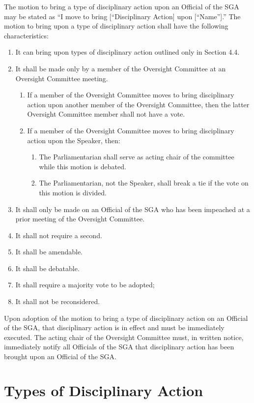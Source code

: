 \documentclass[12pt]{scrreprt}
\begin{document}
The motion to bring a type of disciplinary action upon an Official of the SGA may be stated as “I move to
bring [“Disciplinary Action] upon [“Name”].” The motion to bring upon a type of disciplinary action
shall have the following characteristics:
\begin{enumerate}
    \item It can bring upon types of disciplinary action outlined only in Section 4.4.
    \item It shall be made only by a member of the Oversight Committee at an Oversight Committee
meeting.
    \begin{enumerate}
        \item If a member of the Oversight Committee moves to bring disciplinary action upon another
member of the Oversight Committee, then the latter Oversight Committee member shall
not have a vote.
        \item  If a member of the Oversight Committee moves to bring disciplinary action upon the
Speaker, then:
    \begin{enumerate}
        \item The Parliamentarian shall serve as acting chair of the committee while this motion is debated.
        \item The Parliamentarian, not the Speaker, shall break a tie if the vote on this motion is divided.
    \end{enumerate}
    \end{enumerate}
    \item It shall only be made on an Official of the SGA who has been impeached at a prior meeting of the
Oversight Committee.
    \item It shall not require a second.
    \item It shall be amendable.
    \item  It shall be debatable.
    \item It shall require a majority vote to be adopted;
    \item  It shall not be reconsidered.
\end{enumerate}

Upon adoption of the motion to bring a type of disciplinary action on an Official of the SGA, that
disciplinary action is in effect and must be immediately executed. The acting chair of the Oversight
Committee must, in written notice, immediately notify all Officials of the SGA that disciplinary action
has been brought upon an Official of the SGA.

\section{Types of Disciplinary Action}
\end{document}
